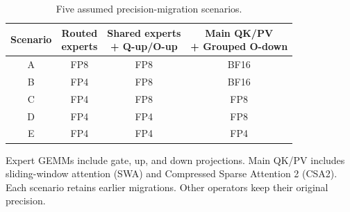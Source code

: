 \begin{table}[t]
\centering
\caption{Five assumed precision-migration scenarios.}
\label{tab:five_stage_migrations}
\begingroup\footnotesize\setlength{\tabcolsep}{4pt}
\begin{tabular}{@{}cccc@{}}\toprule
Scenario & \shortstack{Routed\\experts} & \shortstack{Shared experts\\+ Q-up/O-up} & \shortstack{Main QK/PV\\+ Grouped O-down} \\\midrule
A & FP8 & FP8 & BF16 \\
B & FP4 & FP8 & BF16 \\
C & FP4 & FP8 & FP8 \\
D & FP4 & FP4 & FP8 \\
E & FP4 & FP4 & FP4 \\\bottomrule
\end{tabular}
\par\vspace{2pt}\begin{minipage}{0.98\columnwidth}\scriptsize
Expert GEMMs include gate, up, and down projections. Main QK/PV includes sliding-window attention (SWA) and Compressed Sparse Attention 2 (CSA2). Each scenario retains earlier migrations. Other operators keep their original precision.
\end{minipage}
\endgroup
\end{table}
